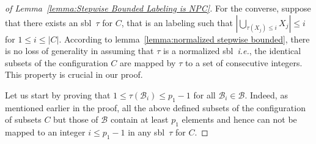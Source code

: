 \documentclass[a4paper,10pt]{llncs}
\newcommand{\SBL}{sbl}
\begin{document}
\begin{proof}[of Lemma~\ref{lemma:Stepwise Bounded Labeling is NPC}]


  For the converse, suppose that there exists an \SBL\ $\tau$ for $C$, that is an labeling such that $\left|
    \bigcup_{\tau(X_j) \leq i} X_j \right| \leq i$ for $1 \leq i \leq
  |C|$. According to lemma~\ref{lemma:normalized stepwise bounded}, there is
  no loss of generality in assuming that $\tau$ is a normalized \SBL\, \emph{i.e.}, the identical subsets of the
  configuration $C$ are mapped by $\tau$ to a set of consecutive
  integers. This property is crucial in our  proof.  

  Let us start by proving that $1 \leq \tau(\mathcal{B}_i) \leq p_1 - 1$
  for all $\mathcal{B}_i \in \mathcal{B}$. Indeed, as mentioned earlier
  in the proof, all the above defined subsets of the configuration of
  subsets $C$ but those of $\mathcal{B}$ contain at least $p_1$ elements
  and hence can not be mapped to an integer $i \leq p_1 - 1$ in any
  \SBL\ $\tau$ for $C$. 


\end{proof}
\end{document}
